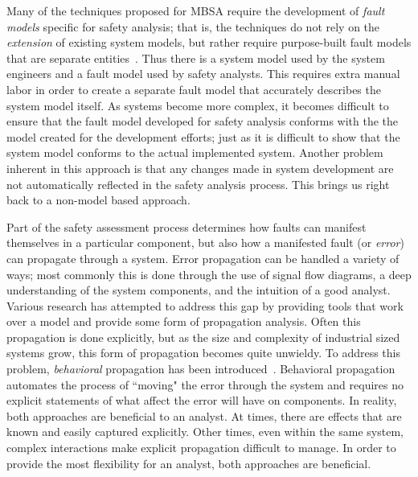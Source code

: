 Many of the techniques proposed for MBSA require the development of {\em fault models} specific for safety analysis; that is, the techniques do not rely on the \emph{extension} of existing system models, but rather require purpose-built fault models that are separate entities~\cite{symbAltaRica, DBLP:conf/tacas/BittnerBCCGGMMZ16, info8010007, Gudemann:2010:FQQ:1909626.1909813}. Thus there is a system model used by the system engineers and a fault model used by safety analysts. This requires extra manual labor in order to create a separate fault model that accurately describes the system model itself. As systems become more complex, it becomes difficult to ensure that the fault model developed for safety analysis conforms with the the model created for the development efforts; just as it is difficult to show that the system model conforms to the actual implemented system. Another problem inherent in this approach is that any changes made in system development are not automatically reflected in the safety analysis process. This brings us right back to a non-model based approach.

Part of the safety assessment process determines how faults can manifest themselves in a particular component, but also how a manifested fault (or \emph{error}) can propagate through a system. Error propagation can be handled a variety of ways; most commonly this is done through the use of signal flow diagrams, a deep understanding of the system components, and the intuition of a good analyst. Various research has attempted to address this gap by providing tools that work over a model and provide some form of propagation analysis. Often this propagation is done explicitly, but as the size and complexity of industrial sized systems grow, this form of propagation becomes quite unwieldy. To address this problem, \emph{behavioral} propagation has been introduced~\cite{DBLP:conf/tacas/BittnerBCCGGMMZ16,stewart2020safety}. Behavioral propagation automates the process of ``moving" the error through the system and requires no explicit statements of what affect the error will have on components. In reality, both approaches are beneficial to an analyst. At times, there are effects that are known and easily captured explicitly. Other times, even within the same system, complex interactions make explicit propagation difficult to manage. In order to provide the most flexibility for an analyst, both approaches are beneficial.

